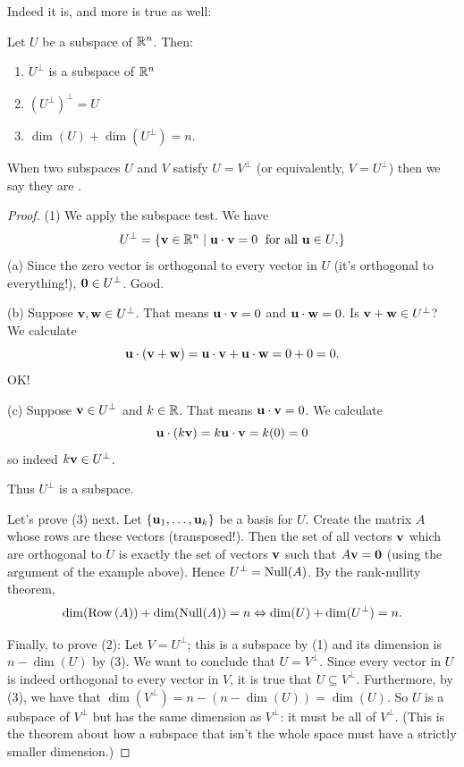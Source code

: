 Indeed it is, and more is true as well:

\begin{theorem}\label{orthogcompprop}
Let $U$ be a subspace of $\mathbb{R}^n$.  Then:
\begin{enumerate}[(1)]
\item $U^\perp$ is a subspace of $\mathbb{R}^n$
\item $(U^\perp)^\perp = U$
\item $\dim(U) + \dim(U^\perp) = n$.
\end{enumerate}
When two subspaces $U$ and $V$ satisfy $U = V^\perp$ (or equivalently,
$V = U^\perp$) then we say they are .
\end{theorem}

\begin{proof}
(1) We apply the subspace test.  We have
$$
U^\perp = \{ \mathbf{v} \in \mathbb{R}^n \mid \mathbf{u} \cdot \mathbf{v} = 0 \textrm{\; for all $\mathbf{u}\in U$}.
 \}
$$
(a) Since the zero vector is orthogonal to every vector in $U$ (it's orthogonal
to everything!), $\mathbf{0} \in U^\perp$. Good.

(b) Suppose $\mathbf{v}, \mathbf{w}\in U^\perp$.  That means $\mathbf{u} \cdot \mathbf{v}= 0$ and $\mathbf{u} \cdot \mathbf{w} =0$.  Is $\mathbf{v} + \mathbf{w} \in U^\perp$?  We calculate
$$
\mathbf{u} \cdot (\mathbf{v} + \mathbf{w}) = \mathbf{u} \cdot \mathbf{v} + \mathbf{u} \cdot \mathbf{w} = 0 + 0 = 0.
$$
OK!

(c) Suppose $\mathbf{v} \in U^\perp$ and $k\in \mathbb{R}$.  That means $\mathbf{u} \cdot \mathbf{v} = 0$.
We calculate
$$
\mathbf{u} \cdot (k\mathbf{v}) = k\mathbf{u} \cdot \mathbf{v} = k (0) = 0
$$
so indeed $k\mathbf{v} \in U^\perp$. 

Thus $U^\perp$ is a subspace.


Let's prove (3) next.  Let $\{\mathbf{u}_1,\ldots, \mathbf{u}_k\}$ be a basis for $U$.
Create the matrix $A$ whose rows are these vectors (transposed!).
Then the set of all vectors $\mathbf{v}$ which are orthogonal to $U$
is exactly the set of vectors $\mathbf{v}$ such that $A\mathbf{v} = \mathbf{0}$
(using the argument of the example above).  Hence $U^\perp = \operatorname{Null}(A)$.
By the rank-nullity theorem, 
$$
\dim(\operatorname{Row\,}(A)) + \dim(\operatorname{Null}(A)) = n \Leftrightarrow \dim(U) + \dim(U^\perp) = n.
$$

Finally, to prove (2):  Let $V = U^\perp$; this is a subspace by (1)
and its dimension is $n - \dim(U)$ by (3).   We want to conclude that $U = V^\perp$.  Since every vector in $U$ is indeed orthogonal to every vector in $V$,
it is true that $U \subseteq V^\perp$.  Furthermore, by (3), we have that  $\dim(V^\perp) = n-(n-\dim(U)) = \dim(U)$.  So $U$ is a subspace of $V^\perp$
but has the same dimension as $V^\perp$: it must be all of $V^\perp$.
(This is the theorem about how a subspace that isn't the whole space
must have a strictly smaller dimension.)

\end{proof}

